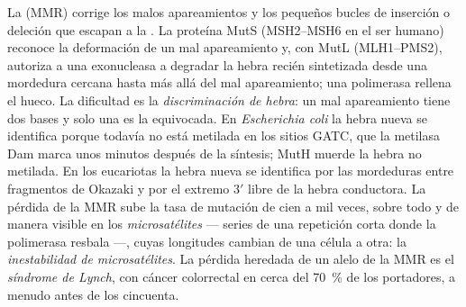 \begin{definition}\label{def:b3:dna-repair:mmr}
La \emph{} (MMR) corrige los malos
apareamientos y los pequeños bucles de inserción o deleción que escapan a
la . La proteína MutS (MSH2--MSH6 en el ser humano)
reconoce la deformación de un mal apareamiento y, con MutL (MLH1--PMS2),
autoriza a una exonucleasa a degradar la hebra recién sintetizada desde
una mordedura cercana hasta más allá del mal apareamiento; una polimerasa
rellena el hueco. La dificultad es la \emph{discriminación de hebra}: un
mal apareamiento tiene dos bases y solo una es la equivocada. En
\emph{Escherichia coli} la hebra nueva se identifica porque todavía no
está metilada en los sitios GATC, que la metilasa Dam marca unos minutos
después de la síntesis; MutH muerde la hebra no metilada. En los
eucariotas la hebra nueva se identifica por las mordeduras entre
fragmentos de Okazaki y por el extremo 3$'$ libre de la hebra
conductora. La pérdida de la MMR sube la tasa de mutación de cien a mil
veces, sobre todo y de manera visible en los \emph{microsatélites} ---
series de una repetición corta donde la polimerasa resbala ---, cuyas
longitudes cambian de una célula a otra: la \emph{inestabilidad de
microsatélites}. La pérdida heredada de un alelo de la MMR es el
\emph{síndrome de Lynch}, con cáncer colorrectal en cerca del
\qty{70}{\%} de los portadores, a menudo antes de los cincuenta.
\end{definition}

